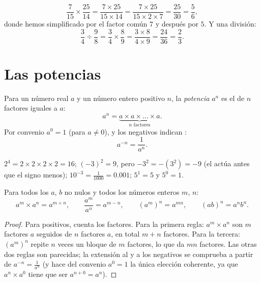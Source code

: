 \begin{example}\label{ex:g9:fractions:mult}
\[
\frac{7}{15} \times \frac{25}{14}
= \frac{7 \times 25}{15 \times 14}
= \frac{7 \times 25}{15 \times 2 \times 7}
= \frac{25}{30} = \frac56,
\]
donde hemos simplificado por el factor común $7$ y después por $5$. Y una
división:
\[
\frac{3}{4} \div \frac{9}{8}
= \frac34 \times \frac89
= \frac{3 \times 8}{4 \times 9}
= \frac{24}{36} = \frac23 .
\]
\end{example}

\section{Las potencias}

\begin{definition}[Potencia]\label{def:g9:fractions:power}
Para un número real $a$ y un número entero positivo $n$, la
\emph{potencia} $a^n$ es el  de $n$ factores iguales a
$a$:
\[
a^n = \underbrace{a \times a \times \dots \times a}_{n \text{ factores}} .
\]
Por convenio $a^0 = 1$ (para $a \neq 0$), y los  negativos indican
:
\[
a^{-n} = \frac{1}{a^n}.
\]
\end{definition}

\begin{example}
$2^4 = 2 \times 2 \times 2 \times 2 = 16$; \quad
$(-3)^2 = 9$, pero $-3^2 = -(3^2) = -9$ (el  actúa antes que el
signo menos); \quad $10^{-3} = \frac{1}{1000} = 0.001$; \quad
$5^1 = 5$ y $5^0 = 1$.
\end{example}

\begin{theorem}\label{thm:g9:fractions:rules}
Para todos los $a$, $b$ no nulos y todos los números enteros $m$, $n$:
\[
a^m \times a^n = a^{m+n},
\qquad
\frac{a^m}{a^n} = a^{m-n},
\qquad
\left(a^m\right)^n = a^{mn},
\qquad
(ab)^n = a^n b^n .
\]
\end{theorem}

\begin{proof}
Para  positivos, cuenta los factores. Para la primera regla:
$a^m \times a^n$ son $m$ factores $a$ seguidos de $n$ factores $a$, en total
$m + n$ factores. Para la tercera:
$\left(a^m\right)^n$ repite $n$ veces un bloque de $m$ factores, lo que da
$mn$ factores. Las otras dos reglas son parecidas; la extensión al  y a los
 negativos se comprueba a partir de $a^{-n} = \frac{1}{a^n}$ (y hace
del convenio $a^0 = 1$ la única elección coherente, ya que
$a^n \times a^0$ tiene que ser $a^{n+0} = a^n$).
\end{proof}


